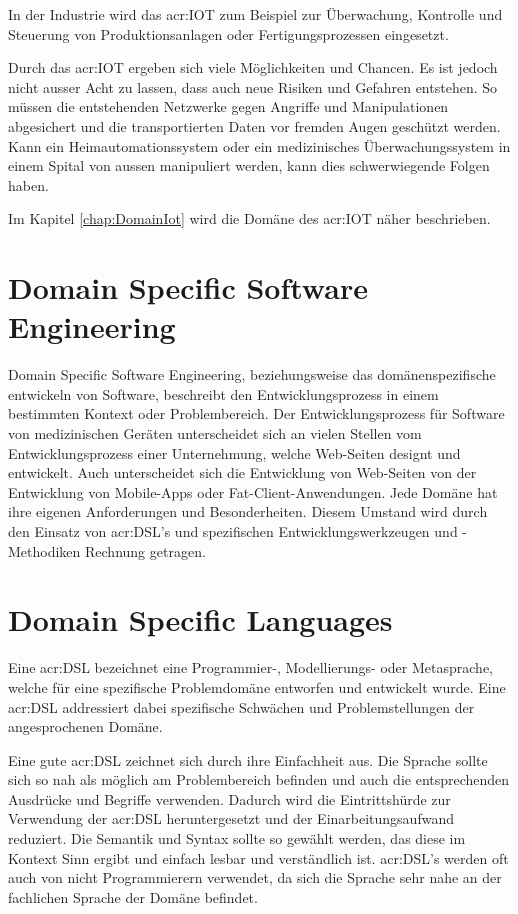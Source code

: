 In der Industrie wird das \gls{acr:IOT} zum Beispiel zur Überwachung, Kontrolle und Steuerung von Produktionsanlagen oder Fertigungsprozessen eingesetzt. 

Durch das \gls{acr:IOT} ergeben sich viele Möglichkeiten und Chancen. Es ist jedoch nicht ausser Acht zu lassen, dass auch neue Risiken und Gefahren entstehen. So müssen die entstehenden Netzwerke gegen Angriffe und Manipulationen abgesichert und die transportierten Daten vor fremden Augen geschützt werden. Kann ein Heimautomationssystem oder ein medizinisches Überwachungssystem in einem Spital von aussen manipuliert werden, kann dies schwerwiegende Folgen haben. 

Im Kapitel \ref{chap:DomainIot}  wird die Domäne des \gls{acr:IOT} näher beschrieben.

\section{Domain Specific Software Engineering}
Domain Specific Software Engineering, beziehungsweise das domänenspezifische entwickeln von Software, beschreibt den Entwicklungsprozess in einem bestimmten Kontext oder Problembereich. Der Entwicklungsprozess für Software von medizinischen Geräten unterscheidet sich an vielen Stellen vom Entwicklungsprozess einer Unternehmung, welche Web-Seiten designt und entwickelt. Auch unterscheidet sich die Entwicklung von Web-Seiten von der Entwicklung von Mobile-Apps oder Fat-Client-Anwendungen. Jede Domäne hat ihre eigenen Anforderungen und Besonderheiten. Diesem Umstand wird durch den Einsatz von \gls{acr:DSL}'s und spezifischen Entwicklungswerkzeugen und -Methodiken Rechnung getragen.

\section{Domain Specific Languages}
Eine \gls{acr:DSL} bezeichnet eine Programmier-, Modellierungs- oder Metasprache, welche für eine spezifische Problemdomäne entworfen und entwickelt wurde. Eine \gls{acr:DSL} addressiert dabei spezifische Schwächen und Problemstellungen der angesprochenen Domäne.

Eine gute \gls{acr:DSL} zeichnet sich durch ihre Einfachheit aus. Die Sprache sollte sich so nah als möglich am Problembereich befinden und auch die entsprechenden Ausdrücke und Begriffe verwenden. Dadurch wird die Eintrittshürde zur Verwendung der \gls{acr:DSL} heruntergesetzt und der Einarbeitungsaufwand reduziert. Die Semantik und Syntax sollte so gewählt werden, das diese im Kontext Sinn ergibt und einfach lesbar und verständlich ist. \gls{acr:DSL}'s werden oft auch von nicht Programmierern verwendet, da sich die Sprache sehr nahe an der fachlichen Sprache der Domäne befindet.

